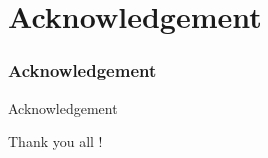 \section*{Acknowledgement}
\frametitle{Acknowledgement}
  \begin{frame}{Acknowledgement}
    \begin{center}
      Thank you all !
    \end{center}
      
  \end{frame}
